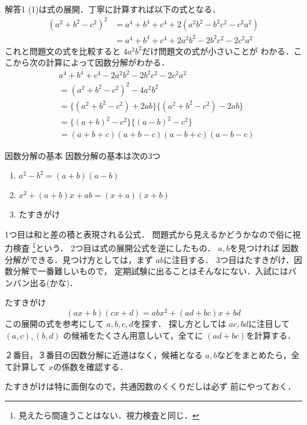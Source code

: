 \documentclass[dvipdfmx]{beamer}
\begin{document}
\begin{frame}{解答1}
	(1)は式の展開．丁寧に計算すれば以下の式となる．
	\begin{align*}
		(a^2+b^2-c^2)^2 &= a^4 + b^4 + c^4 +2(a^2b^2 - b^2c^2 -c^2a^2)\\
						&= a^4 + b^4 + c^4 +2a^2b^2 -2 b^2c^2 -2c^2a^2
	\end{align*}
	これと問題文の式を比較すると $4a^2b^2$だけ問題文の式が小さいことが
	わかる．ここから次の計算によって因数分解がわかる．
	\begin{align*}
		&a^4+b^4+c^4-2a^2b^2-2b^2c^2-2c^2a^2 \\
		&=(a^2+b^2-c^2)^2 - 4a^2b^2\\
		&=\{(a^2+b^2-c^2)+2ab\}\{(a^2+b^2-c^2)-2ab\}\\
		&=\{(a+b)^2-c^2\}\{(a-b)^2-c^2\}\\
		&=(a+b+c)(a+b-c)(a-b+c)(a-b-c)
	\end{align*}

\end{frame}


\begin{frame}{因数分解の基本}
	因数分解の基本は次の3つ
	\begin{enumerate}
		\item $a^2-b^2=(a+b)(a-b)$
		\item $x^2+(a+b)x+ab=(x+a)(x+b)$
		\item たすきがけ
	\end{enumerate}
	1つ目は和と差の積と表現される公式．
	問題式から見えるかどうかなので俗に視力検査
	\footnote{見えたら間違うことはない．視力検査と同じ．}という．
	2つ目は式の展開公式を逆にしたもの． $a, b$を見つければ
	因数分解ができる．見つけ方としては，まず $ab$に注目する．
	3つ目はたすきがけ．因数分解で一番難しいもので，
	定期試験に出ることはそんなにない．入試にはバンバン出る(かな)．
\end{frame}
\begin{frame}{たすきがけ}
	\[(ax+b)(cx+d)=abx^2+(ad+bc)x+bd\]
	この展開の式を参考にして $a, b, c, d$を探す．
	探し方としては $ac, bd$に注目して $(a, c), (b, d)$
	の候補をたくさん用意しいて，全てに
	$(ad+bc)$を計算する．

	２番目，３番目の因数分解に近道はなく，候補となる
	$a, b$などをまとめたら，全て計算して $x$の係数を確認する．
	
	たすきがけは特に面倒なので，共通因数のくくりだしは必ず
	前にやっておく．

\end{frame}
\end{document}

